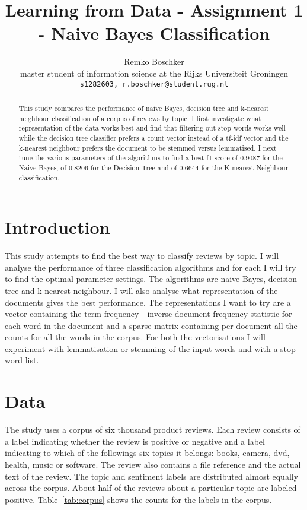 \documentclass[11pt]{article}
\title{Learning from Data - Assignment 1 - Naive Bayes Classification}
\author{Remko Boschker \\
  master student of information science at the Rijks Universiteit Groningen \\
  {\tt s1282603, r.boschker@student.rug.nl} }
\date{}
\begin{document}
\maketitle
\begin{abstract}
This study compares the performance of naive Bayes, decision tree and k-nearest neighbour classification of a corpus of reviews by topic. I first investigate what representation of the data works best and find that filtering out stop words works well while the decision tree classifier prefers a count vector instead of a tf-idf vector and the k-nearest neighbour prefers the document to be stemmed versus lemmatised. I next tune the various parameters of the algorithms to find a best f1-score of 0.9087 for the Naive Bayes, of 0.8206 for the Decision Tree and of 0.6644 for the K-nearest Neighbour classification.
\end{abstract}

\section{Introduction}

This study attempts to find the best way to classify reviews by topic. I will analyse the performance of three classification algorithms and for each I will try to find the optimal parameter settings. The algorithms are naive Bayes, decision tree and k-nearest neighbour. I will also analyse what representation of the documents gives the best performance. The representations I want to try are a vector containing the term frequency - inverse document frequency statistic for each word in the document and a sparse matrix containing per document all the counts for all the words in the corpus. For both the vectorisations I will experiment with lemmatisation or stemming of the input words and with a stop word list.

\section{Data}

The study uses a corpus of six thousand product reviews. Each review consists of a label indicating whether the review is positive or negative and a label indicating to which of the followings six topics it belongs: books, camera, dvd, health, music or software. The review also contains a file reference and the actual text of the review. The topic and sentiment labels are distributed almost equally across the corpus. About half of the reviews about a particular topic are labeled positive. Table~\ref{tab:corpus} shows the counts for the labels in the corpus.
\end{document}
